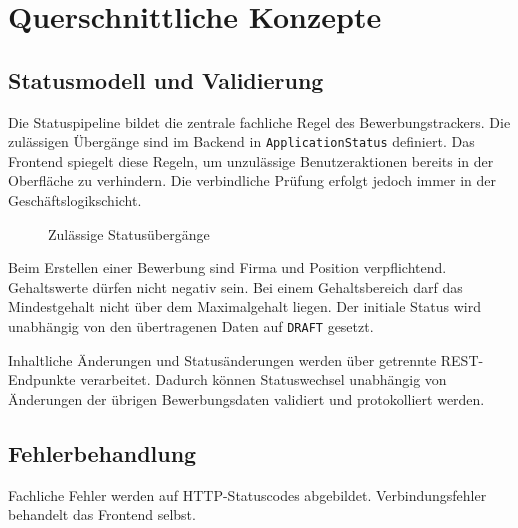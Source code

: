 \documentclass[a4paper,11pt]{article}
\begin{document}

\newpage
\section{Querschnittliche Konzepte}
\label{sec:crosscutting-concepts}


\subsection{Statusmodell und Validierung}

Die Statuspipeline bildet die zentrale fachliche Regel des Bewerbungstrackers.
Die zulässigen Übergänge sind im Backend in \texttt{ApplicationStatus} definiert.
Das Frontend spiegelt diese Regeln, um unzulässige Benutzeraktionen bereits in der Oberfläche zu verhindern.
Die verbindliche Prüfung erfolgt jedoch immer in der Geschäftslogikschicht.

\vspace{0.3cm}

\begin{figure}[H]
\centering
\resizebox{\textwidth}{!}{
  
}
\caption{Zulässige Statusübergänge}
\label{fig:status-model}
\end{figure}

Beim Erstellen einer Bewerbung sind Firma und Position verpflichtend.
Gehaltswerte dürfen nicht negativ sein.
Bei einem Gehaltsbereich darf das Mindestgehalt nicht über dem Maximalgehalt liegen.
Der initiale Status wird unabhängig von den übertragenen Daten auf \texttt{DRAFT} gesetzt.

Inhaltliche Änderungen und Statusänderungen werden über getrennte REST-Endpunkte verarbeitet.
Dadurch können Statuswechsel unabhängig von Änderungen der übrigen Bewerbungsdaten validiert und protokolliert werden.


\subsection{Fehlerbehandlung}

Fachliche Fehler werden auf HTTP-Statuscodes abgebildet.
Verbindungsfehler behandelt das Frontend selbst.
\end{document}
